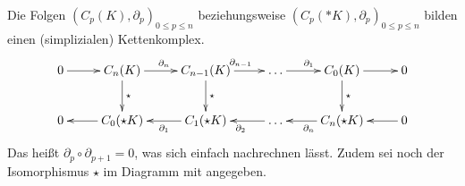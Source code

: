   \begin{folgerung}
    \label{folgSimplizialerKettenkomplex}
    Die Folgen \( \left( C_{p}(K), \partial_{p} \right)_{0 \le p \le n} \) beziehungsweise \( \left( C_{p}(*K), \partial_{p} \right)_{0 \le p \le n} \) 
    bilden einen (simplizialen) Kettenkomplex.
    \begin{align}
      \begin{xy}
        \xymatrix{
          0 \ar[r] & 
          C_{n}(K) \ar[r]^{\partial_{n}} \ar[d]^{\star} & 
          C_{n-1}(K) \ar[r]^{\partial_{n-1}} \ar[d]^{\star} & 
          \ldots \ar[r]^{\partial_{1}} & 
          C_{0}(K) \ar[r] \ar[d]^{\star} &
          0 \\
          0  & 
          C_{0}(\star K) \ar[l] & 
          C_{1}( \star K) \ar[l]^{\partial_{1}} & 
          \ldots \ar[l]^{\partial_{2}} & 
          C_{n}(\star K) \ar[l]^{\partial_{n}} &
          0 \ar[l]
        }
      \end{xy}
    \end{align}
    Das heißt \( \partial_{p} \circ \partial_{p+1} = 0\), was sich einfach nachrechnen lässt.
    Zudem sei noch der Isomorphismus \( \star \) im Diagramm mit angegeben.
  \end{folgerung}

